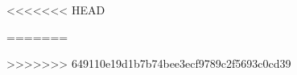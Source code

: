 \documentclass[12pt]{book}
\begin{document}
%    
%    
   \pagestyle{fancy}

        

%         
%         
%         
%         
%         
%         
%         
%         
%         
%         
%         
%         
%         
%         

%         
%         
%         
%         
%         

<<<<<<< HEAD
%         
%         
%         
%         
%         
%         

%         
%         
%         
%         
%         
%         
%         
%         

%        
=======
        


>>>>>>> 649110e19d1b7b74bee3ecf9789c2f5693c0cd39
\end{document}
